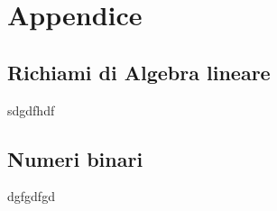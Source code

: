 \chapter{Appendice}

\section{Richiami di Algebra lineare}
sdgdfhdf

\section{Numeri binari}
dgfgdfgd